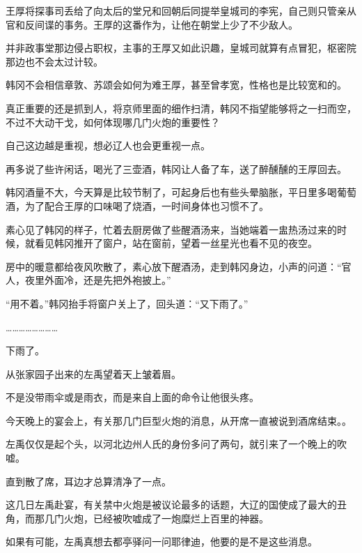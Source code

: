 王厚将探事司丢给了向太后的堂兄和回朝后同提举皇城司的李宪，自己则只管亲从官和反间谍的事务。王厚的这番作为，让他在朝堂上少了不少敌人。

并非政事堂那边侵占职权，主事的王厚又如此识趣，皇城司就算有点冒犯，枢密院那边也不会太过计较。

韩冈不会相信章敦、苏颂会如何为难王厚，甚至曾孝宽，性格也是比较宽和的。

真正重要的还是抓到人，将京师里面的细作扫清，韩冈不指望能够将之一扫而空，不过不大动干戈，如何体现哪几门火炮的重要性？

自己这边越是重视，想必辽人也会更重视一点。

再多说了些许闲话，喝光了三壶酒，韩冈让人备了车，送了醉醺醺的王厚回去。

韩冈酒量不大，今天算是比较节制了，可起身后也有些头晕脑胀，平日里多喝葡萄酒，为了配合王厚的口味喝了烧酒，一时间身体也习惯不了。

素心见了韩冈的样子，忙着去厨房做了些醒酒汤来，当她端着一盅热汤过来的时候，就看见韩冈推开了窗户，站在窗前，望着一丝星光也看不见的夜空。

房中的暖意都给夜风吹散了，素心放下醒酒汤，走到韩冈身边，小声的问道：“官人，夜里外面冷，还是先把外袍披上。”

“用不着。”韩冈抬手将窗户关上了，回头道：“又下雨了。”

……………………

下雨了。

从张家园子出来的左禹望着天上皱着眉。

不是没带雨伞或是雨衣，而是来自上面的命令让他很头疼。

今天晚上的宴会上，有关那几门巨型火炮的消息，从开席一直被说到酒席结束。。

左禹仅仅是起个头，以河北边州人氏的身份多问了两句，就引来了一个晚上的吹嘘。

直到散了席，耳边才总算清净了一点。

这几日左禹赴宴，有关禁中火炮是被议论最多的话题，大辽的国使成了最大的丑角，而那几门火炮，已经被吹嘘成了一炮糜烂上百里的神器。

如果有可能，左禹真想去都亭驿问一问耶律迪，他要的是不是这些消息。
